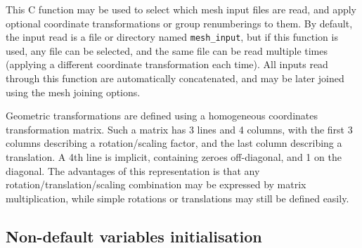 {{{This C function may be used to select which mesh input files
are read, and apply optional coordinate transformations or group renumberings
to them. By default, the input read is a file or directory named
\texttt{mesh\_input}, but if this function is used, any file can be selected,
and the same file can be read multiple times (applying a different
coordinate transformation each time).
All inputs read through this function are automatically concatenated, and
may be later joined using the mesh joining options.

Geometric transformations are defined using a homogeneous coordinates
transformation matrix. Such a matrix has 3 lines and 4 columns, with the
first 3 columns describing a rotation/scaling factor, and the last column
describing a translation. A 4th line is implicit, containing zeroes
off-diagonal, and 1 on the diagonal. The advantages of this representation
is that any rotation/translation/scaling combination may be expressed
by matrix multiplication, while simple rotations or translations
may still be defined easily.

\subsection{Non-default variables initialisation} \label{sec:cs_user_initialization}

}}}
